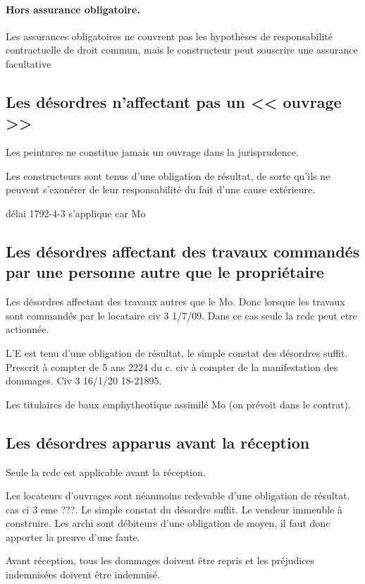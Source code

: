 	\paragraph{Hors assurance obligatoire.}	Les assurances obligatoires ne couvrent pas les hypothèses de responsabilité contractuelle de droit commun, mais le constructeur peut souscrire une assurance facultative

	\subsection{Les désordres n'affectant pas un << ouvrage >>}

		Les peintures ne constitue jamais un ouvrage dans la jurisprudence.

		Les constructeurs sont tenus d'une obligation de résultat, de sorte qu'ils ne peuvent s'exonérer de leur responsabilité du fait d'une cause extérieure.

		délai 1792-4-3 s'applique car Mo

	\subsection{Les désordres affectant des travaux commandés par une personne autre que le propriétaire}

		Les désordres affectant des travaux autres que le Mo. Donc lorsque les travaux sont commandés par le locataire civ 3 1/7/09. Dans ce cas seule la rcdc peut etre actionnée.

		L'E est tenu d'une obligation de résultat, le simple constat des désordres suffit. Prescrit à compter de 5 ans 2224 du c. civ à compter de la manifestation des dommages. Civ 3 16/1/20 18-21895.

		Les titulaires de baux emphytheotique assimilé Mo (on prévoit dans le contrat).

	\subsection{Les désordres apparus avant la réception}

		Seule la rcdc est applicable avant la réception.

		Les locateurs d'ouvrages sont néanmoins redevable d'une obligation de résultat.  cas ci 3 eme ???. Le simple constat du désordre suffit. Le vendeur immeuble à construire. Les archi sont débiteurs d'une obligation de moyen, il faut donc apporter la preuve d'une faute.

		Avant réception, tous les dommages doivent être repris et les préjudices indemnisées doivent être indemnisé.

